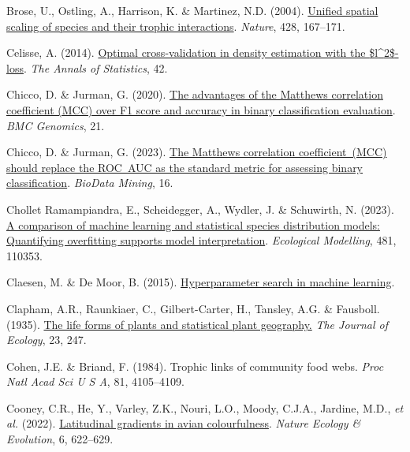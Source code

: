 \documentclass[
  letterpaper,
]{scrbook}
\newlength{\cslhangindent}
\newenvironment{CSLReferences}[2] %
 {\begin{list}{}{%
  \setlength{\itemindent}{0pt}
  \setlength{\leftmargin}{0pt}
  \setlength{\parsep}{0pt}
  \ifodd #1
   \setlength{\leftmargin}{\cslhangindent}
   \setlength{\itemindent}{-1\cslhangindent}
  \fi
  \setlength{\itemsep}{#2\baselineskip}}}
 {\end{list}}
\begin{document}
\begin{CSLReferences}{1}{0}
Brose, U., Ostling, A., Harrison, K. \& Martinez, N.D. (2004).
\href{https://doi.org/10.1038/nature02297}{Unified spatial scaling of
species and their trophic interactions}. \emph{Nature}, 428, 167--171.

Celisse, A. (2014). \href{https://doi.org/10.1214/14-aos1240}{Optimal
cross-validation in density estimation with the
{\$}l{\^{}}{\textbraceleft}2{\textbraceright}{\$}-loss}. \emph{The
Annals of Statistics}, 42.

Chicco, D. \& Jurman, G. (2020).
\href{https://doi.org/10.1186/s12864-019-6413-7}{The advantages of the
Matthews correlation coefficient (MCC) over F1 score and accuracy in
binary classification evaluation}. \emph{BMC Genomics}, 21.

Chicco, D. \& Jurman, G. (2023).
\href{https://doi.org/10.1186/s13040-023-00322-4}{The Matthews
correlation coefficient~(MCC) should replace the ROC~AUC as the standard
metric for assessing binary classification}. \emph{BioData Mining}, 16.

Chollet Ramampiandra, E., Scheidegger, A., Wydler, J. \& Schuwirth, N.
(2023). \href{https://doi.org/10.1016/j.ecolmodel.2023.110353}{A
comparison of machine learning and statistical species distribution
models: Quantifying overfitting supports model interpretation}.
\emph{Ecological Modelling}, 481, 110353.

Claesen, M. \& De Moor, B. (2015).
\href{https://doi.org/10.48550/ARXIV.1502.02127}{Hyperparameter search
in machine learning}.

Clapham, A.R., Raunkiaer, C., Gilbert-Carter, H., Tansley, A.G. \&
Fausboll. (1935). \href{https://doi.org/10.2307/2256153}{The life forms
of plants and statistical plant geography.} \emph{The Journal of
Ecology}, 23, 247.

Cohen, J.E. \& Briand, F. (1984). Trophic links of community food webs.
\emph{Proc Natl Acad Sci U S A}, 81, 4105--4109.

Cooney, C.R., He, Y., Varley, Z.K., Nouri, L.O., Moody, C.J.A., Jardine,
M.D., \emph{et al.} (2022).
\href{https://doi.org/10.1038/s41559-022-01714-1}{Latitudinal gradients
in avian colourfulness}. \emph{Nature Ecology \& Evolution}, 6,
622--629.


\end{CSLReferences}
\end{document}
